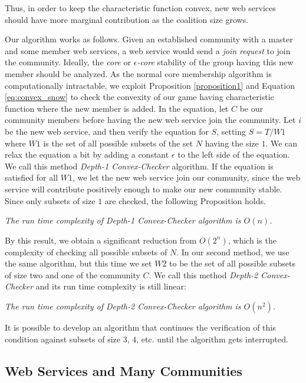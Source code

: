 Thus, in order to keep the characteristic function convex, new web
services should have more marginal contribution as the coalition
size grows.

Our algorithm works as follows. Given an  established community
with a master and some member web services, a web service would send a \emph{join request} to join  the
community. Ideally, the \emph{core}
or \emph{$\epsilon$-core} stability of the group having this new
member should be analyzed. As the normal core membership algorithm is computationally
intractable, we exploit Proposition \ref{proposition1} and Equation
\ref{eq:convex_snow} to check the convexity of our game having
characteristic function where the new member is added. In the
equation, let $C$  be our community members before
having the new web service join the community. Let  ${i}$ be the new web
service, and then verify the equation for $S$, setting $ S = T /
W1 $ where $W1$ is the set of all possible subsets of the set $N$
having the size $1$. We can relax the equation a bit by adding a
constant $\epsilon$ to the left side of the equation. We call this
method \emph{Depth-1 Convex-Checker} algorithm. If the equation is
satisfied for all $W1$, we let the new web service join our
community, since the web service will contribute positively enough
to make our new community stable. Since only subsets of size $1$
are checked, the following Proposition holds.

\begin{theorem}\label{complexity1}
\emph{The run time complexity of Depth-1 Convex-Checker algorithm is
$O(n)$.}
\end{theorem}

By this result, we obtain a significant reduction from $O(2^n)$,
which is the complexity of checking all possible subsets of $N$.
In our second method, we use the same algorithm, but this time we
set $W2$ to be the set of all possible subsets of size two and one
of the community $C$. We call this method \emph{Depth-2
Convex-Checker} and its run time complexity is still
linear:

\begin{theorem}\label{complexity2}
\emph{The run time complexity of Depth-2 Convex-Checker algorithm is
$O(n^2)$.}
\end{theorem}

It is possible to develop an algorithm that continues the
verification of this condition against subsets of size $3$,
$4$, etc. until the algorithm gets interrupted.

\subsection {Web Services and Many Communities}


